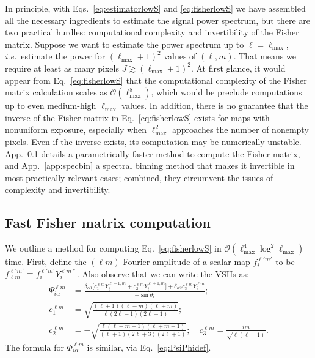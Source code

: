 \documentclass[prd,aps,twocolumn,nofootinbib,superscriptaddress,preprintnumbers,balancelastpage,longbibliography,floatfix]{revtex4-1}
\begin{document}
In principle, with Eqs.~\eqref{eq:estimatorlowS} and \eqref{eq:fisherlowS} we have assembled all the necessary ingredients to estimate the signal power spectrum, but there are two practical hurdles: computational complexity and invertibility of the Fisher matrix. Suppose we want to estimate the power spectrum up to $\ell = \ell_\mathrm{max}$, \emph{i.e.}~estimate the power for $(\ell_\mathrm{max}+1)^2$ values of $(\ell, m)$. That means we require at least as many pixels $J \gtrsim (\ell_\mathrm{max}+1)^2$. At first glance, it would appear from Eq.~\eqref{eq:fisherlowS} that the computational complexity of the Fisher matrix calculation scales as $\mathcal{O}(\ell_\mathrm{max}^8)$, which would be preclude computations up to even medium-high $\ell_\mathrm{max}$ values. In addition, there is no guarantee that the inverse of the Fisher matrix in Eq.~\eqref{eq:fisherlowS} exists for maps with nonuniform exposure, especially when $\ell_\mathrm{max}^2$ approaches the number of nonempty pixels. Even if the inverse exists, its computation may be numerically unstable. App.~\ref{app:complexity} details a parametrically faster method to compute the Fisher matrix, and App.~\ref{app:specbin} a spectral binning method that makes it invertible in most practically relevant cases; combined, they circumvent the issues of complexity and invertibility.

\subsection{Fast Fisher matrix computation}\label{app:complexity}
We outline a method for computing Eq.~\eqref{eq:fisherlowS} in $\mathcal{O}(\ell_\mathrm{max}^4 \log^2 \ell_\mathrm{max})$ time. First, define the $(\ell m)$ Fourier amplitude of a scalar map $f^{\ell' m'}_i$ to be $f_{\ell m}^{\ell' m'} \equiv f^{\ell' m'}_i Y_i^{\ell m*}$. Also observe that we can write the VSHs as:
\begin{align}
\Psi^{\ell m}_{i \alpha} &= \frac{\delta_{\alpha 1} \big[ c^{\ell m}_1 Y^{\ell-1, m}_i + c^{\ell m}_2 Y^{\ell+1, m}_i \big]  + \delta_{\alpha 2} c^{\ell m}_3 Y^{\ell m}_i}{-\sin \theta_i}; \nonumber \\
c^{\ell m}_1 &=  \sqrt{\frac{(\ell+1)(\ell - m)(\ell + m)}{\ell(2\ell -1)(2\ell +1)}}; \\
c^{\ell m}_2 &= - \sqrt{\frac{\ell(\ell - m+1)(\ell + m+1)}{(\ell+1)(2\ell +3)(2\ell +1)}}; \quad
c^{\ell m}_3 = \frac{i m}{\sqrt{\ell(\ell+1)}}.  \nonumber
\end{align}
The formula for $\Phi^{\ell m}_{i \alpha}$ is similar, via Eq.~\eqref{eq:PsiPhidef}.
\end{document}
